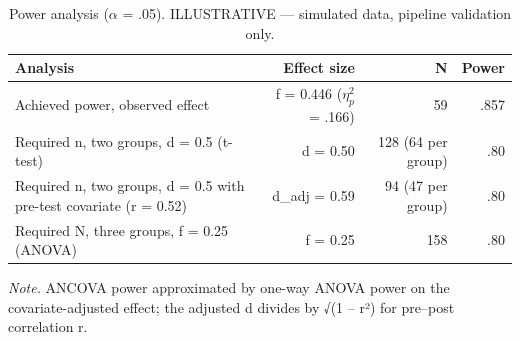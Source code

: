 \begin{table}[htbp]
\centering
\small
\caption{Power analysis ($\alpha$ = .05). ILLUSTRATIVE — simulated data, pipeline validation only.}
\label{tab:T16}
\begin{tabular}{lrrr}
\toprule
Analysis & Effect size & N & Power \\
\midrule
Achieved power, observed effect & f = 0.446 ($\eta^2_p$ = .166) & 59 & .857 \\
Required n, two groups, d = 0.5 (t-test) & d = 0.50 & 128 (64 per group) & .80 \\
Required n, two groups, d = 0.5 with pre-test covariate (r = 0.52) & d\_adj = 0.59 & 94 (47 per group) & .80 \\
Required N, three groups, f = 0.25 (ANOVA) & f = 0.25 & 158 & .80 \\
\bottomrule
\end{tabular}
\par\smallskip\footnotesize\textit{Note.} ANCOVA power approximated by one-way ANOVA power on the covariate-adjusted effect; the adjusted d divides by √(1 -- r²) for pre–post correlation r.
\end{table}
